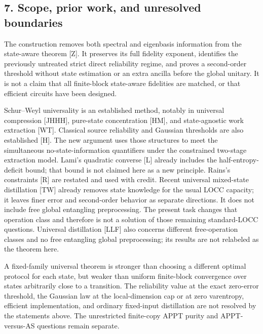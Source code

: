 \documentclass[11pt]{article}
\begin{document}
\hypertarget{scope-prior-work-and-unresolved-boundaries}{%
\subsection{7. Scope, prior work, and unresolved boundaries}\label{scope-prior-work-and-unresolved-boundaries}}

The construction removes both spectral and eigenbasis information from the state-aware theorem {[}Z{]}. It preserves its full fidelity exponent, identifies the previously untreated strict direct reliability regime, and proves a second-order threshold without state estimation or an extra ancilla before the global unitary. It is not a claim that all finite-block state-aware fidelities are matched, or that efficient circuits have been designed.

Schur--Weyl universality is an established method, notably in universal compression {[}JHHH{]}, pure-state concentration {[}HM{]}, and state-agnostic work extraction {[}WT{]}. Classical source reliability and Gaussian thresholds are also established {[}H{]}. The new argument uses those structures to meet the simultaneous no-state-information quantifiers under the constrained two-stage extraction model. Lami's quadratic converse {[}L{]} already includes the half-entropy-deficit bound; that bound is not claimed here as a new principle. Rains's constraints {[}R{]} are restated and used with credit. Recent universal mixed-state distillation {[}TW{]} already removes state knowledge for the usual LOCC capacity; it leaves finer error and second-order behavior as separate directions. It does not include free global entangling preprocessing. The present task changes that operation class and therefore is not a solution of those remaining standard-LOCC questions. Universal distillation {[}LLF{]} also concerns different free-operation classes and no free entangling global preprocessing; its results are not relabeled as the theorem here.

A fixed-family universal theorem is stronger than choosing a different optimal protocol for each state, but weaker than uniform finite-block convergence over states arbitrarily close to a transition. The reliability value at the exact zero-error threshold, the Gaussian law at the local-dimension cap or at zero varentropy, efficient implementation, and ordinary fixed-input distillation are not resolved by the statements above. The unrestricted finite-copy APPT purity and APPT-versus-AS questions remain separate.
\end{document}
